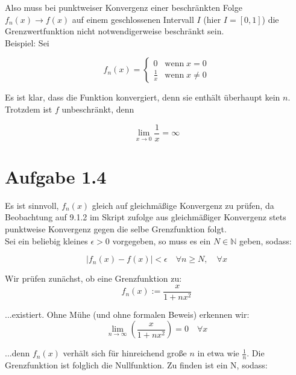 \documentclass[a4paper,german,12pt,smallheadings]{scrartcl}
\begin{document}
Also muss bei punktweiser Konvergenz einer beschränkten Folge $f_n(x) \rightarrow f(x)$ auf einem geschlossenen Intervall $I$ (hier $I=[0,1]$) die Grenzwertfunktion nicht notwendigerweise beschränkt sein.\\

Beispiel: Sei

\begin{equation*}
  f_n(x) = \begin{cases}
    0 & \mbox{wenn} \; x = 0 \\
    \frac{1}{x} & \mbox{wenn} \; x \neq 0
  \end{cases}
\end{equation*}

Es ist klar, dass die Funktion konvergiert, denn sie enthält überhaupt kein
$n$. Trotzdem ist $f$ unbeschränkt, denn

\begin{equation*}
  \lim_{x \to 0} \frac{1}{x} = \infty
\end{equation*}

\section{Aufgabe 1.4}


Es ist sinnvoll, $f_n(x)$ gleich auf gleichmäßige Konvergenz zu prüfen, da Beobachtung auf 9.1.2 im Skript zufolge aus gleichmäßiger Konvergenz stets punktweise Konvergenz gegen die selbe Grenzfunktion folgt.\\

Sei ein beliebig kleines $\epsilon>0$ vorgegeben, so muss es ein $N \in \mathbb{N}$ geben, sodass:

\begin{equation*}
|f_n(x)-f(x)|<\epsilon \quad \forall n \geq N, \quad \forall x
\end{equation*}

Wir prüfen zunächst, ob eine Grenzfunktion zu:
\begin{equation*}
f_n(x):= \frac{x}{1+nx^2}
\end{equation*}

...existiert. Ohne Mühe (und ohne formalen Beweis) erkennen wir:
\begin{equation*}
\lim\limits_{n \to \infty} \left(\frac{x}{1+nx^2}\right)=0 \quad \forall x
\end{equation*}

...denn $f_n(x)$ verhält sich für hinreichend große $n$ in etwa wie $\frac{1}{n}$. Die Grenzfunktion ist folglich die Nullfunktion. Zu finden ist ein N, sodass:
\end{document}
